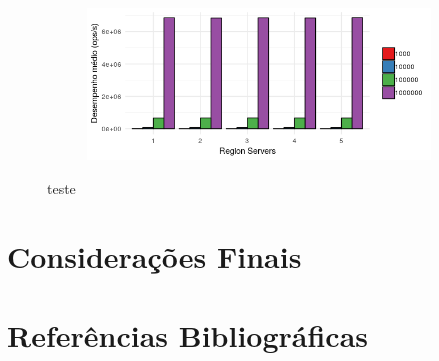 \documentclass[12pt]{article}
\begin{document}
\begin{figure}
    \begin{subfigure}[b]{0.49\textwidth}   
        \centering 
        \includegraphics[width=\textwidth]{images/figura22}
        \caption{}
    \end{subfigure}
    \caption{teste}
\end{figure}

\section{Considerações Finais}
\label{sec:finais}







\section{Referências Bibliográficas}



\end{document}

